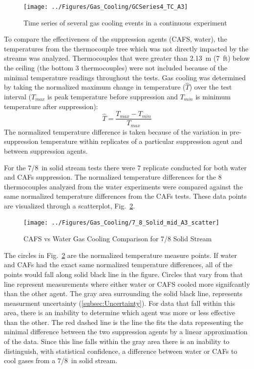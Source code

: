 \documentclass[12pt,oneside]{book}
\begin{document}
\begin{figure}[ht!]
	\texttt{[image: ../Figures/Gas\_Cooling/GCSeries4\_TC\_A3]}
	\caption{Time series of several gas cooling events in a continuous experiment}
	\label{fig:gas_cooling_exp4}
\end{figure}

To compare the effectiveness of the suppression agents (CAFS, water), the temperatures from the thermocouple tree which was not directly impacted by the streams was analyzed. Thermocouples that were greater than 2.13~m (7~ft) below the ceiling (the bottom 3 thermocouples) were not included because of the minimal temperature readings throughout the tests. Gas cooling was determined by taking the normalized maximum change in temperature ($\hat{T}$) over the test interval ($T_{max}$ is peak temperature before suppression and $T_{min}$ is minimum temperature after suppression):
\begin{equation}
\label{eq:norm_temp}
\hat{T} = \frac{T_{max}-T_{min}}{T_{max}}
\end{equation}
The normalized temperature difference is taken because of the variation in pre-suppression temperature within replicates of a particular suppression agent and between suppression agents.

For the 7/8~in solid stream tests there were 7 replicate conducted for both water and CAFs suppression. The normalized temperature differences for the 8 thermocouples analyzed from the water experiments were compared against the same normalized temperature differences from the CAFs tests. These data points are visualized through a scatterplot, Fig.~\ref{fig:CAFS_Water_Comp_7_8}.

\begin{figure}[!ht]
	\texttt{[image: ../Figures/Gas\_Cooling/7\_8\_Solid\_mid\_A3\_scatter]}
	\caption{CAFS vs Water Gas Cooling Comparison for 7/8 Solid Stream}
	\label{fig:CAFS_Water_Comp_7_8}
\end{figure}

The circles in Fig.~\ref{fig:CAFS_Water_Comp_7_8} are the normalized temperature measure points. If water and CAFs had the exact same normalized temperature differences, all of the points would fall along solid black line in the figure. Circles that vary from that line represent measurements where either water or CAFS cooled more signifcantly than the other agent. The gray area surrounding the solid black line, represents measurment uncertainty (\ref{subsec:Uncertainty}). For data that fall within this area, there is an inability to determine which agent was more or less effective than the other. The red dashed line is the line the fits the data representing the minimal difference between the two suppression agents by a linear approximation of the data. Since this line falls within the gray area there is an inability to distinguish, with statistical confidence, a difference between water or CAFs to cool gases from a 7/8~in solid stream.
\end{document}
